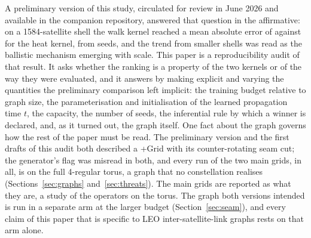 \documentclass[preprint,11pt,3p]{elsarticle}
\begin{document}
A preliminary version of this study, circulated for review in June 2026 and available in the
companion repository, answered that question in the affirmative: on a 1584-satellite shell the
walk kernel reached a mean absolute error of \numPrelimWalkMAE{} against \numPrelimHeatMAE{} for the
heat kernel, from \numPrelimSeeds{} seeds, and the trend from smaller shells was read as the
ballistic mechanism emerging with scale. This paper is a reproducibility audit of that result. It
asks whether the ranking is a property of the two kernels or of the way they were evaluated, and
it answers by making explicit and varying the quantities the preliminary comparison left
implicit: the training budget relative to graph size, the parameterisation and initialisation of
the learned propagation time $t$, the capacity, the number of seeds, the inferential rule by
which a winner is declared, and, as it turned out, the graph itself. One fact about the graph
governs how the rest of the paper must be read. The preliminary version and the first drafts of
this audit both described a +Grid with its counter-rotating seam cut; the generator's flag was
misread in both, and every run of the two main grids, \numTotalRuns{} in all, is on the full
4-regular torus, a graph that no constellation realises (Sections~\ref{sec:graphs}
and~\ref{sec:threats}). The main grids are reported as what they are, a study of the operators on
the torus. The graph both versions intended is run in a separate arm at the larger budget
(Section~\ref{sec:seam}), and every claim of this paper that is specific to LEO
inter-satellite-link graphs rests on that arm alone.
\end{document}
